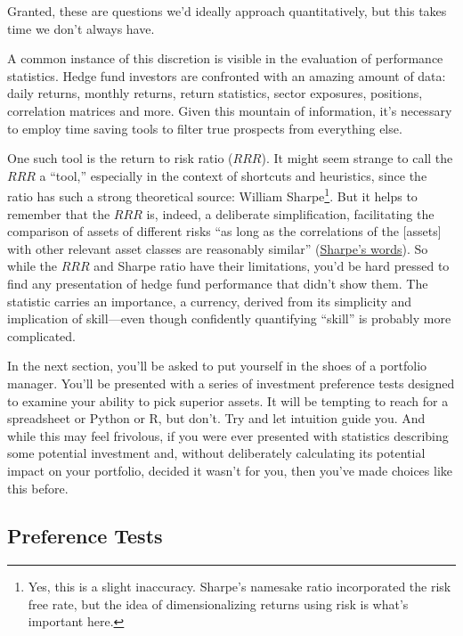 \documentclass[]{article}
\let\rmarkdownfootnote\footnote%
\def\footnote{\protect\rmarkdownfootnote}
\begin{document}
Granted, these are questions we'd ideally approach quantitatively, but
this takes time we don't always have.

A common instance of this discretion is visible in the evaluation of
performance statistics. Hedge fund investors are confronted with an
amazing amount of data: daily returns, monthly returns, return
statistics, sector exposures, positions, correlation matrices and more.
Given this mountain of information, it's necessary to employ time saving
tools to filter true prospects from everything else.

One such tool is the return to risk ratio (\(RRR\)). It might seem
strange to call the \(RRR\) a ``tool,'' especially in the context of
shortcuts and heuristics, since the ratio has such a strong theoretical
source: William Sharpe\footnote{Yes, this is a slight inaccuracy.
  Sharpe's namesake ratio incorporated the risk free rate, but the idea
  of dimensionalizing returns using risk is what's important here.}. But
it helps to remember that the \(RRR\) is, indeed, a deliberate
simplification, facilitating the comparison of assets of different risks
``as long as the correlations of the {[}assets{]} with other relevant
asset classes are reasonably similar''
(\href{https://web.stanford.edu/~wfsharpe/art/sr/sr.htm}{Sharpe's
words}). So while the \(RRR\) and Sharpe ratio have their limitations,
you'd be hard pressed to find any presentation of hedge fund performance
that didn't show them. The statistic carries an importance, a currency,
derived from its simplicity and implication of skill---even though
confidently quantifying ``skill'' is probably more complicated.

In the next section, you'll be asked to put yourself in the shoes of a
portfolio manager. You'll be presented with a series of investment
preference tests designed to examine your ability to pick superior
assets. It will be tempting to reach for a spreadsheet or Python or R,
but don't. Try and let intuition guide you. And while this may feel
frivolous, if you were ever presented with statistics describing some
potential investment and, without deliberately calculating its potential
impact on your portfolio, decided it wasn't for you, then you've made
choices like this before.

\hypertarget{preference-tests}{%
\subsection{Preference Tests}\label{preference-tests}}
\end{document}
